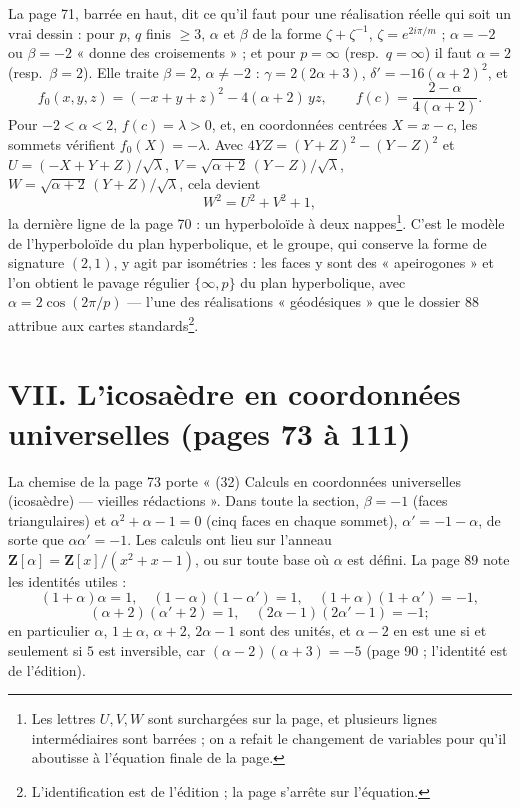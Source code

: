 \documentclass[11pt,a4paper]{article}
\begin{document}
La page 71, barrée en haut, dit ce qu'il faut pour une réalisation réelle qui
soit un vrai dessin : pour $p$, $q$ finis $\geq 3$, $\alpha$ et $\beta$ de la
forme $\zeta + \zeta^{-1}$, $\zeta = e^{2i\pi/m}$ ; $\alpha = -2$ ou $\beta = -2$
« donne des croisements » ; et pour $p = \infty$ (resp.\ $q = \infty$) il faut
$\alpha = 2$ (resp.\ $\beta = 2$). Elle traite $\beta = 2$, $\alpha \neq -2$ :
$\gamma = 2(2\alpha + 3)$, $\delta' = -16(\alpha + 2)^2$, et
\[
f_0(x, y, z) = (-x + y + z)^2 - 4(\alpha + 2)\,yz, \qquad f(c) = \frac{2 -
\alpha}{4(\alpha + 2)} .
\]
Pour $-2 < \alpha < 2$, $f(c) = \lambda > 0$, et, en coordonnées centrées $X =
x - c$, les sommets vérifient $f_0(X) = -\lambda$. Avec $4YZ = (Y + Z)^2 - (Y -
Z)^2$ et $U = (-X + Y + Z)/\sqrt\lambda$, $V = \sqrt{\alpha + 2}\,(Y -
Z)/\sqrt\lambda$, $W = \sqrt{\alpha + 2}\,(Y + Z)/\sqrt\lambda$, cela devient
\[
W^2 = U^2 + V^2 + 1 ,
\]
la dernière ligne de la page 70 : un hyperboloïde à deux nappes\footnote{Les
lettres $U, V, W$ sont surchargées sur la page, et plusieurs lignes
intermédiaires sont barrées ; on a refait le changement de variables pour qu'il
aboutisse à l'équation finale de la page.}. C'est le modèle de l'hyperboloïde
du plan hyperbolique, et le groupe, qui conserve la forme de signature $(2,
1)$, y agit par isométries : les faces y sont des « apeirogones » et l'on
obtient le pavage régulier $\{\infty, p\}$ du plan hyperbolique, avec $\alpha =
2\cos(2\pi/p)$ --- l'une des réalisations « géodésiques » que le dossier 88
attribue aux cartes standards\footnote{L'identification est de l'édition ; la
page s'arrête sur l'équation.}.

\section*{VII. L'icosaèdre en coordonnées universelles (pages 73 à 111)}

La chemise de la page 73 porte « (32) Calculs en coordonnées universelles
(icosaèdre) --- vieilles rédactions ». Dans toute la section, $\beta = -1$
(faces triangulaires) et $\alpha^2 + \alpha - 1 = 0$ (cinq faces en chaque
sommet), $\alpha' = -1 - \alpha$, de sorte que $\alpha\alpha' = -1$. Les calculs
ont lieu sur l'anneau $\mathbf{Z}[\alpha] = \mathbf{Z}[x]/(x^2 + x - 1)$, ou sur
toute base où $\alpha$ est défini. La page 89 note les identités utiles :
\[
(1 + \alpha)\alpha = 1, \quad (1 - \alpha)(1 - \alpha') = 1, \quad (1 + \alpha)(1 +
\alpha') = -1,
\]
\[
(\alpha + 2)(\alpha' + 2) = 1, \quad (2\alpha - 1)(2\alpha' - 1) = -1 ;
\]
en particulier $\alpha$, $1 \pm \alpha$, $\alpha + 2$, $2\alpha - 1$ sont des
unités, et $\alpha - 2$ en est une si et seulement si $5$ est inversible, car
$(\alpha - 2)(\alpha + 3) = -5$ (page 90 ; l'identité est de l'édition).
\end{document}
